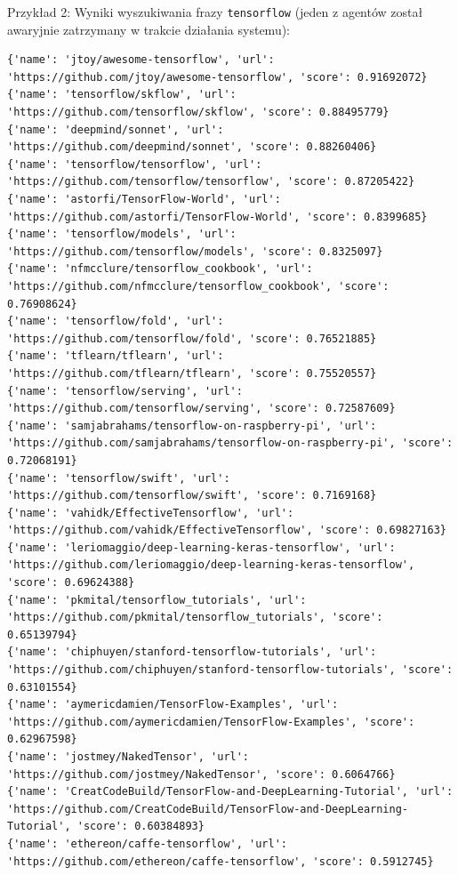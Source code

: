 \documentclass[12pt, oneside, final]{report}
\begin{document}
\begin{landscape}
Przykład 2: Wyniki wyszukiwania frazy \texttt{tensorflow} (jeden z agentów został awaryjnie zatrzymany w trakcie działania systemu):
\begin{verbatim}
{'name': 'jtoy/awesome-tensorflow', 'url': 'https://github.com/jtoy/awesome-tensorflow', 'score': 0.91692072}
{'name': 'tensorflow/skflow', 'url': 'https://github.com/tensorflow/skflow', 'score': 0.88495779}
{'name': 'deepmind/sonnet', 'url': 'https://github.com/deepmind/sonnet', 'score': 0.88260406}
{'name': 'tensorflow/tensorflow', 'url': 'https://github.com/tensorflow/tensorflow', 'score': 0.87205422}
{'name': 'astorfi/TensorFlow-World', 'url': 'https://github.com/astorfi/TensorFlow-World', 'score': 0.8399685}
{'name': 'tensorflow/models', 'url': 'https://github.com/tensorflow/models', 'score': 0.8325097}
{'name': 'nfmcclure/tensorflow_cookbook', 'url': 'https://github.com/nfmcclure/tensorflow_cookbook', 'score': 0.76908624}
{'name': 'tensorflow/fold', 'url': 'https://github.com/tensorflow/fold', 'score': 0.76521885}
{'name': 'tflearn/tflearn', 'url': 'https://github.com/tflearn/tflearn', 'score': 0.75520557}
{'name': 'tensorflow/serving', 'url': 'https://github.com/tensorflow/serving', 'score': 0.72587609}
{'name': 'samjabrahams/tensorflow-on-raspberry-pi', 'url': 'https://github.com/samjabrahams/tensorflow-on-raspberry-pi', 'score': 0.72068191}
{'name': 'tensorflow/swift', 'url': 'https://github.com/tensorflow/swift', 'score': 0.7169168}
{'name': 'vahidk/EffectiveTensorflow', 'url': 'https://github.com/vahidk/EffectiveTensorflow', 'score': 0.69827163}
{'name': 'leriomaggio/deep-learning-keras-tensorflow', 'url': 'https://github.com/leriomaggio/deep-learning-keras-tensorflow', 'score': 0.69624388}
{'name': 'pkmital/tensorflow_tutorials', 'url': 'https://github.com/pkmital/tensorflow_tutorials', 'score': 0.65139794}
{'name': 'chiphuyen/stanford-tensorflow-tutorials', 'url': 'https://github.com/chiphuyen/stanford-tensorflow-tutorials', 'score': 0.63101554}
{'name': 'aymericdamien/TensorFlow-Examples', 'url': 'https://github.com/aymericdamien/TensorFlow-Examples', 'score': 0.62967598}
{'name': 'jostmey/NakedTensor', 'url': 'https://github.com/jostmey/NakedTensor', 'score': 0.6064766}
{'name': 'CreatCodeBuild/TensorFlow-and-DeepLearning-Tutorial', 'url': 'https://github.com/CreatCodeBuild/TensorFlow-and-DeepLearning-Tutorial', 'score': 0.60384893}
{'name': 'ethereon/caffe-tensorflow', 'url': 'https://github.com/ethereon/caffe-tensorflow', 'score': 0.5912745}

\end{verbatim}
\end{landscape}
\end{document}
